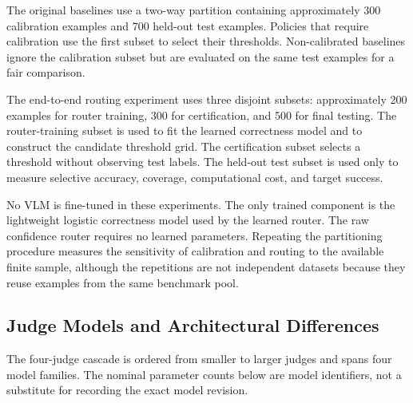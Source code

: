 \documentclass[11pt]{article}
\begin{document}
The original baselines use a two-way partition containing approximately 300
calibration examples and 700 held-out test examples. Policies that require
calibration use the first subset to select their thresholds. Non-calibrated
baselines ignore the calibration subset but are evaluated on the same test
examples for a fair comparison.

The end-to-end routing experiment uses three disjoint subsets: approximately
200 examples for router training, 300 for certification, and 500 for final
testing. The router-training subset is used to fit the learned correctness
model and to construct the candidate threshold grid. The certification
subset selects a threshold without observing test labels. The held-out test
subset is used only to measure selective accuracy, coverage, computational
cost, and target success.

No VLM is fine-tuned in these experiments. The only trained component is the
lightweight logistic correctness model used by the learned router. The raw
confidence router requires no learned parameters. Repeating the partitioning
procedure measures the sensitivity of calibration and routing to the
available finite sample, although the repetitions are not independent
datasets because they reuse examples from the same benchmark pool.

\subsection{Judge Models and Architectural Differences}
The four-judge cascade is ordered from smaller to larger judges and spans four model families. The nominal parameter counts below are model identifiers, not a substitute for recording the exact model revision.

\end{document}
